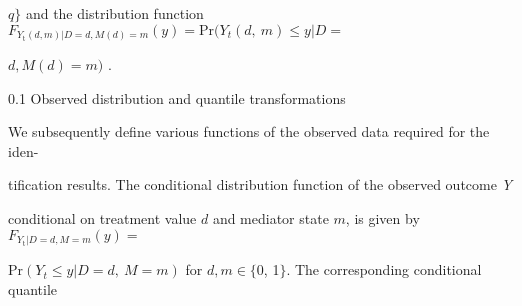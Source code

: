 \documentclass[a4paper,12pt]{article}
\begin{document}
$q\}$ and the distribution function $F_{Y_{\mathrm{t}}(d,m)|D=d,M(d)=m}(y) = \mathrm{P}\mathrm{r}(Y_{t}(d,\ m) \leq y|D =$

$d, M(d)=m)$ .

0.1 Observed distribution and quantile transformations

We subsequently define various functions of the observed data required for the iden-

tification results. The conditional distribution function of the observed outcome {\it Y}

conditional on treatment value $d$ and mediator state $m$, is given by $F_{Y_{\mathrm{t}}|D=d,M=m}(y)=$

$\mathrm{P}\mathrm{r}(Y_{t}\leq y|D=d,\ M=m)$ for $d, m\in\{0$, 1$\}$. The corresponding conditional quantile
\end{document}
